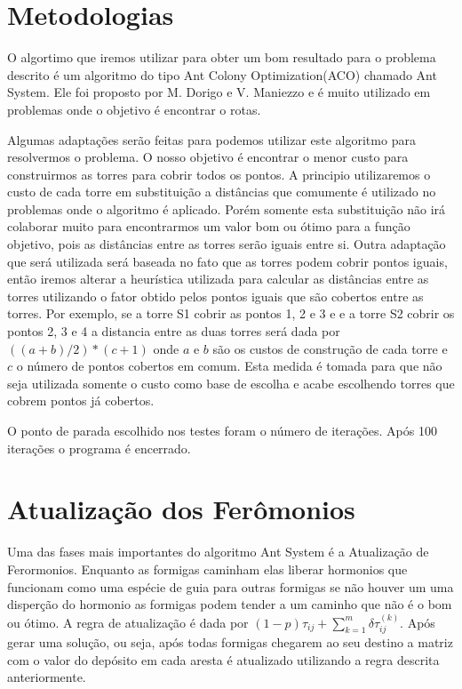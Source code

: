 \documentclass[12pt]{article}
\begin{document}
\section{Metodologias}

O algortimo que iremos utilizar para obter um bom resultado para o problema
descrito é um algoritmo do tipo Ant Colony Optimization(ACO) chamado Ant System.
Ele foi proposto por M. Dorigo e V. Maniezzo e é muito utilizado em 
problemas onde o objetivo é encontrar o rotas.

Algumas adaptações serão feitas para podemos utilizar este algoritmo para
resolvermos o problema. O nosso objetivo é encontrar o menor custo para 
construirmos as torres para cobrir todos os pontos. A principio utilizaremos
o custo de cada torre em substituição a distâncias que comumente é utilizado no problemas
onde o algoritmo é aplicado. Porém somente esta substituição não irá
colaborar muito para encontrarmos um valor bom ou ótimo para a função 
objetivo, pois as distâncias entre as torres serão iguais entre si. Outra
adaptação que será utilizada será baseada no fato que as torres podem
cobrir pontos iguais, então iremos alterar a heurística utilizada para calcular
as distâncias entre as torres utilizando o fator obtido pelos pontos iguais que são 
cobertos entre as torres. Por exemplo, se a torre S1 cobrir as pontos 1, 2 e 3 e 
e a torre S2 cobrir os pontos 2, 3 e 4 a distancia entre as duas torres
será dada por $((a+b)/2)*(c+1)$ onde $a$ e $b$ são os custos de construção de 
cada torre e $c$ o número de pontos cobertos em comum. Esta medida é tomada
para que não seja utilizada somente o custo como base de escolha e acabe escolhendo
torres que cobrem pontos já cobertos.

O ponto de parada escolhido nos testes foram o número de iterações. Após
100 iterações o programa é encerrado.

\section{Atualização dos Ferômonios}

Uma das fases mais importantes do algoritmo Ant System é a Atualização
de Ferormonios. Enquanto as formigas caminham elas liberar hormonios que funcionam
como uma espécie de guia para outras formigas se não houver um uma disperção do hormonio
as formigas podem tender a um caminho que não é o bom ou ótimo. A regra de atualização
é dada por $(1-p)\tau_{ij} + \sum_{k=1}^{m}\delta\tau_{ij}^{(k)}$. Após gerar uma
solução, ou seja, após todas formigas chegarem ao seu destino a matriz com 
o valor do depósito em cada aresta é atualizado utilizando a regra descrita anteriormente.
\end{document}
